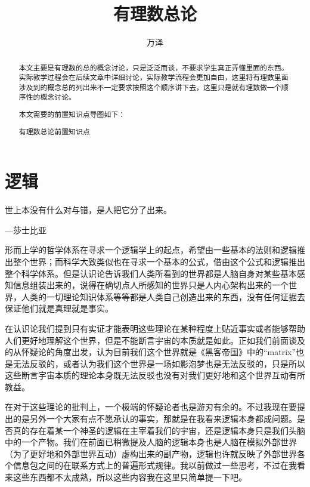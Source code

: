 \documentclass[12pt]{exam}%
\begin{document}
\begin{coverpages}
\title{有理数总论}
\author{万泽}
\maketitle
\begin{abstract}
本文主要是有理数的总的概念讨论，只是泛泛而谈，不要求学生真正弄懂里面的东西。实际教学过程会在后续文章中详细讨论，实际教学流程会更加自由，这里将有理数里面涉及到的概念总的列出来不一定要求按照这个顺序讲下去，这里只是就有理数做一个顺序性的概念讨论。

本文需要的前置知识点导图如下：
\begin{linefig}{有理数总论前置知识点}
\end{linefig}
\end{abstract}
\tableofcontents
\end{coverpages}


\section{逻辑}
\begin{flushright}
\begin{notecard}[yellow!30]{12em}
世上本没有什么对与错，是人把它分了出来。

{\vspace{-10pt}\hfill\sffamily —莎士比亚}
\end{notecard}
\end{flushright}

形而上学的哲学体系在寻求一个逻辑学上的起点，希望由一些基本的法则和逻辑推出整个世界；而科学大致类似也在寻求一个基本的公式，借由这个公式和逻辑推出整个科学体系。但是认识论告诉我们人类所看到的世界都是人脑自身对某些基本感知信息组装出来的，说得在确切点人所感知的世界只是人内心架构出来的一个世界，人类的一切理论知识体系等等都是人类自己创造出来的东西，没有任何证据去保证他们就是真理就是事实。

在认识论我们提到只有实证才能表明这些理论在某种程度上贴近事实或者能够帮助人们更好地理解这个世界，但是不能断言宇宙的本质就是如此。正如我们前面谈及的从怀疑论的角度出发，认为目前我们这个世界就是《黑客帝国》中的“matrix”也是无法反驳的，或者认为我们这个世界是一场如影泡梦也是无法反驳的，只是所以这些断言宇宙本质的理论本身既无法反驳也没有对我们更好地和这个世界互动有所教益。

在对于这些理论的批判上，一个极端的怀疑论者也是游刃有余的。不过我现在要提出的是另外一个大家有点不愿承认的事实，那就是在我看来逻辑本身都成问题。是否真的存在着某一个神圣的逻辑在主宰着我们的宇宙，还是逻辑本身只是我们头脑中的一个产物。我们在前面已稍微提及人脑的逻辑本身也是人脑在模拟外部世界（为了更好地和外部世界互动）虚构出来的副产物，逻辑也许就反映了外部世界各个信息包之间的在联系方式上的普遍形式规律。我以前做过一些思考，不过在我看来这些东西都不太成熟，所以这些内容我在这里只简单提一下吧。
\end{document}
